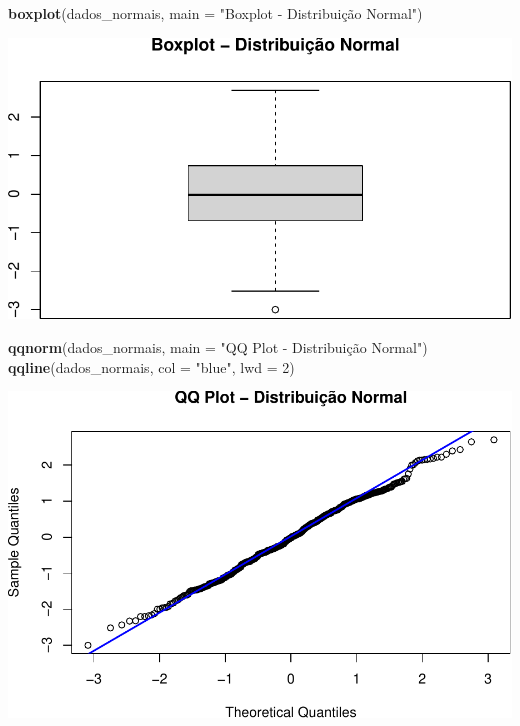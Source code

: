 \documentclass[
]{book}
\newenvironment{Shaded}{\begin{snugshade}}{\end{snugshade}}
\newcommand{\AttributeTok}[1]{\textcolor[rgb]{0.13,0.29,0.53}{#1}}
\newcommand{\DecValTok}[1]{\textcolor[rgb]{0.00,0.00,0.81}{#1}}
\newcommand{\FunctionTok}[1]{\textcolor[rgb]{0.13,0.29,0.53}{\textbf{#1}}}
\newcommand{\NormalTok}[1]{#1}
\newcommand{\StringTok}[1]{\textcolor[rgb]{0.31,0.60,0.02}{#1}}
\begin{document}
\begin{Shaded}
\begin{Highlighting}[]
\FunctionTok{boxplot}\NormalTok{(dados\_normais, }\AttributeTok{main =} \StringTok{"Boxplot {-} Distribuição Normal"}\NormalTok{)}
\end{Highlighting}
\end{Shaded}

\includegraphics{LivroEstatisticaR_files/figure-latex/enormalDist-2.pdf}

\begin{Shaded}
\begin{Highlighting}[]
\FunctionTok{qqnorm}\NormalTok{(dados\_normais, }\AttributeTok{main =} \StringTok{"QQ Plot {-} Distribuição Normal"}\NormalTok{)}
\FunctionTok{qqline}\NormalTok{(dados\_normais, }\AttributeTok{col =} \StringTok{"blue"}\NormalTok{, }\AttributeTok{lwd =} \DecValTok{2}\NormalTok{)}
\end{Highlighting}
\end{Shaded}

\includegraphics{LivroEstatisticaR_files/figure-latex/enormalDist-3.pdf}
\end{document}
